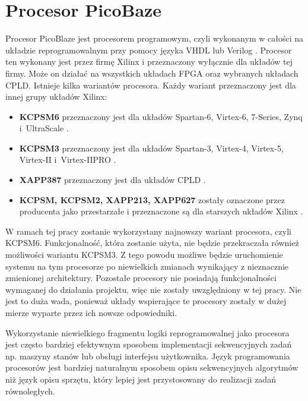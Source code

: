 
\rozdzial

\section{Procesor PicoBaze}


Procesor PicoBlaze jest procesorem programowym, czyli wykonanym w całości na układzie reprogramowalnym przy pomocy języka VHDL lub Verilog \cite{wiki_Mikroprocesor_programowy}.
Procesor ten wykonany jest przez firmę Xilinx i przeznaczony wyłącznie dla układów tej firmy. Może on działać na wszystkich układach FPGA oraz wybranych układach CPLD.
Istnieje kilka wariantów procesora. Każdy wariant przeznaczony jest dla innej grupy układów Xilinx:

\begin{itemize}
	\item		\textbf{KCPSM6} przeznaczony jest dla układów Spartan-6, Virtex-6, 7-Series, Zynq i~UltraScale \cite{kcpsm6}.
	\item		\textbf{KCPSM3} przeznaczony jest dla układów Spartan-3, Virtex-4, Virtex-5, Virtex-II i~Virtex-IIPRO \cite{kcpsm3}.
	\item		\textbf{XAPP387} przeznaczony jest dla układów CPLD \cite{PicoBlazeList}.
	\item		\textbf{KCPSM, KCPSM2, XAPP213, XAPP627} zostały oznaczone przez producenta jako przestarzałe i przeznaczone są dla starszych układów Xilinx  \cite{PicoBlazeList}.
\end{itemize}


W ramach tej pracy zostanie wykorzystany najnowszy wariant procesora, czyli KCPSM6. Funkcjonalność, która zostanie użyta, nie będzie przekraczała również możliwości wariantu KCPSM3. Z tego powodu możliwe będzie uruchomienie systemu na tym procesorze po niewielkich zmianach wynikający z nieznacznie zmienionej architektury. Pozostałe procesory nie posiadają funkcjonalności wymaganej do działania projektu, więc nie zostały uwzględniony w tej pracy. Nie jest to duża wada, ponieważ układy wspierające te procesory zostały w dużej mierze wyparte przez ich nowsze odpowiedniki.


Wykorzystanie niewielkiego fragmentu logiki reprogramowalnej jako procesora jest często bardziej efektywnym sposobem implementacji sekwencyjnych zadań np. maszyny stanów lub obsługi interfejsu użytkownika. Język programowania procesorów jest bardziej naturalnym sposobem opisu sekwencyjnych algorytmów niż język opisu sprzętu, który lepiej jest przystosowany do realizacji zadań równoległych.
\cite{kcpsm6}


